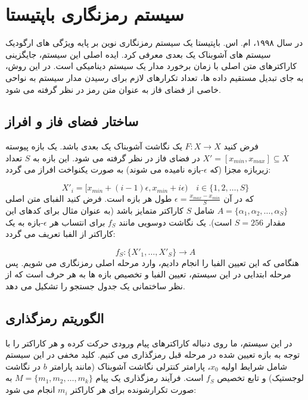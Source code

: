 \documentclass[12pt]{report}
\begin{document}
\chapter{سیستم رمزنگاری باپتیستا}

در سال ۱۹۹۸، ام. اس. باپتیستا یک سیستم رمزنگاری نوین بر پایه 
ویژگی های ارگودیک سیستم های آشوبناک یک بعدی معرفی کرد. ایده اصلی این سیستم، جایگزینی کاراکترهای 
متن اصلی با زمان برخورد مدار یک سیستم دینامیکی است. در این روش، 
به جای تبدیل مستقیم داده ها، تعداد تکرارهای لازم برای رسیدن مدار سیستم به نواحی خاصی از فضای فاز 
به عنوان متن رمز در نظر گرفته می شود.

\section{ساختار فضای فاز و افراز}
فرض کنید $F: X \to X$ یک نگاشت آشوبناک یک بعدی باشد. یک بازه پیوسته 
$X' = [x_{min}, x_{max}] \subseteq X$ در فضای فاز در نظر گرفته می شود. این بازه به $S$ تعداد 
زیربازه مجزا (که $\epsilon$-بازه نامیده می شوند) به صورت یکنواخت افراز می گردد:

\begin{equation}
    X'_i = [x_{min} + (i - 1)\epsilon, x_{min} + i\epsilon) \quad i \in \{1, 2, \dots, S\}
\end{equation}
\noindent
که در آن $\epsilon = \frac{x_{max} - x_{min}}{S}$ طول هر بازه است. 
فرض کنید الفبای متن اصلی $A = \{\alpha_1, \alpha_2, \dots, \alpha_S\}$ شامل $S$ کاراکتر متمایز 
باشد (به عنوان مثال برای کدهای  این مقدار $S = 256$ است). یک نگاشت دوسویی 
مانند $f_S$ برای انتساب هر $\epsilon$-بازه به یک کاراکتر از الفبا تعریف می گردد:

\begin{equation}
    f_S : \{X'_1, \dots, X'_S\} \to A
\end{equation}
\noindent
هنگامی که این تعیین الفبا را انجام دادیم، وارد مرحله اصلی رمزنگاری می شویم. پس مرحله ابتدایی در 
این سیستم، تعیین الفبا و تخصیص بازه ها به هر حرف است که از نظر ساختمانی یک جدول جستجو 
 را تشکیل می دهد.

\newpage

\section{الگوریتم رمزگذاری}
در این سیستم، ما روی دنباله کاراکترهای پیام ورودی حرکت کرده و هر کاراکتر را با توجه به بازه تعیین 
شده در مرحله قبل رمزگذاری می کنیم. کلید مخفی در این سیستم شامل شرایط اولیه $x_0$، پارامتر کنترلی 
نگاشت آشوبناک (مانند پارامتر $b$ در نگاشت لوجستیک) و تابع تخصیص $f_S$ است. 
فرآیند رمزگذاری یک پیام $M = \{m_1, m_2, \dots, m_k\}$ به صورت تکرارشونده برای هر کاراکتر $m_i$ 
انجام می شود:
\end{document}
